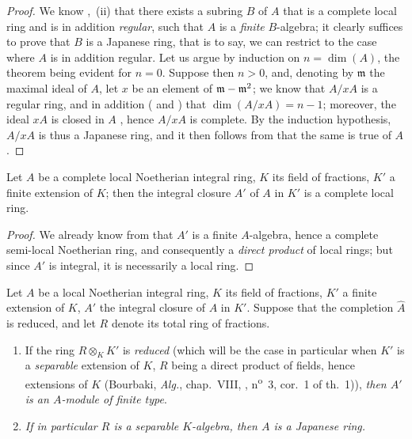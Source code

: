 \begin{proof}
We know ,~(ii) that there exists a subring $B$ of $A$ that is a complete local
ring and is in addition \emph{regular}, such that $A$ is a \emph{finite} $B$-algebra; it clearly suffices to prove that $B$ is a Japanese ring, that is to say, we can restrict to the case where $A$ is in addition regular.
Let us argue by induction on $n=\dim(A)$, the theorem being evident for $n=0$.
Suppose then $n>0$, and, denoting by $\mathfrak{m}$ the maximal ideal of $A$, let $x$ be an element of $\mathfrak{m}-\mathfrak{m}^2$; we know  that $A/xA$ is a regular ring, and in addition ( and ) that $\dim(A/xA)=n-1$; moreover, the ideal $xA$ is closed in $A$ , hence $A/xA$ is complete.
By the induction hypothesis, $A/xA$ is thus a Japanese ring, and it then follows from  that the same is true of $A$.
\end{proof}

\begin{corollary}[23.1.6]
\label{0.23.1.6}
Let $A$ be a complete local Noetherian integral ring, $K$ its field of fractions, $K'$ a finite extension of $K$; then the integral closure $A'$ of $A$ in $K'$ is a complete local ring.
\end{corollary}

\begin{proof}
We already know from  that $A'$ is a finite $A$-algebra, hence a complete semi-local Noetherian ring, and consequently a \emph{direct product} of local rings; but since $A'$ is integral, it is necessarily a local ring.
\end{proof}

\begin{proposition}[23.1.7]
\label{0.23.1.7}
Let $A$ be a local Noetherian integral ring, $K$ its field of fractions, $K'$ a finite extension of $K$, $A'$ the integral closure of $A$ in $K'$.
Suppose that the completion $\hat{A}$ is \textup{reduced}, and let $R$ denote its total ring of fractions.
\begin{enumerate}
  \item[{\rm(i)}] If the ring $R\otimes_K K'$ is \emph{reduced} \textup{(which will be the case in particular when $K'$ is a \emph{separable} extension of $K$, $R$ being a direct product of fields, hence extensions of $K$ \textnormal{(Bourbaki, \emph{Alg.}, chap.~VIII, , n\textsuperscript{o}~3, cor.~1 of th.~1)})}, \emph{then $A'$ is an $A$-module of finite type}.
  \item[{\rm(ii)}] \emph{If in particular $R$ is a separable $K$-algebra, then $A$ is a Japanese ring.}
\end{enumerate}
\end{proposition}


